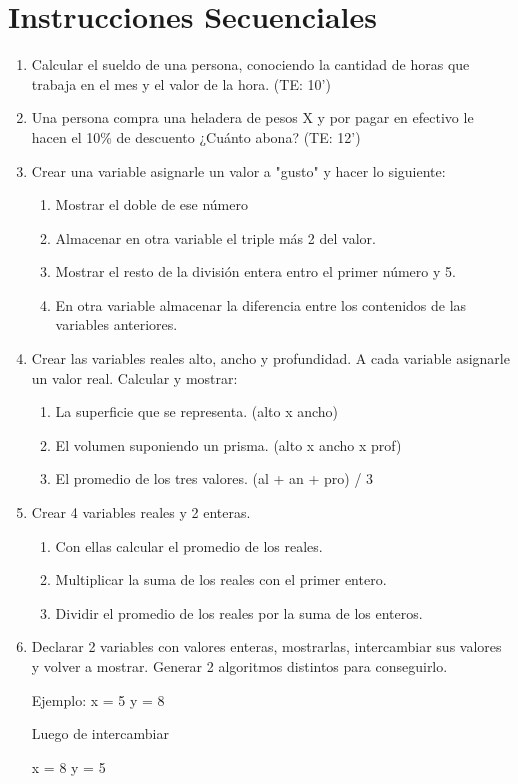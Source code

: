 \chapter{Instrucciones Secuenciales}

\begin{enumerate}[resume]

	\item Calcular el sueldo de una persona, conociendo la cantidad de horas que trabaja en el mes y el valor de la hora. (TE: 10')

	\item Una persona compra una heladera de pesos X y por pagar en efectivo le hacen el 10\% de descuento ¿Cuánto abona? (TE: 12')


  \item Crear una variable asignarle un valor a "gusto"  y hacer lo siguiente:
    \begin{enumerate}
      \item Mostrar el doble de ese n\'umero
      \item Almacenar en otra variable el triple más 2 del valor.
      \item Mostrar el resto de la división entera entro el primer número y 5.
      \item En otra variable almacenar la diferencia entre los contenidos de las variables anteriores.
    \end{enumerate}

  \item Crear las variables reales alto, ancho y profundidad. A cada variable asignarle un valor real. Calcular y mostrar:
    \begin{enumerate}
      \item La superficie que se representa. (alto x ancho)
      \item El volumen suponiendo un prisma. (alto x ancho x prof)
      \item El promedio de los tres valores. (al + an + pro) / 3
    \end{enumerate}

  \item Crear 4 variables reales y 2 enteras.
    \begin{enumerate}
      \item Con ellas calcular el promedio de los reales.
      \item Multiplicar la suma de los reales con el primer entero.
      \item Dividir el promedio de los reales por la suma de los enteros.
    \end{enumerate}

  \item Declarar 2 variables con valores enteras, mostrarlas, intercambiar sus valores
y volver a mostrar. Generar 2 algoritmos distintos para conseguirlo.

Ejemplo:         x = 5    y = 8

Luego de intercambiar

x = 8    y = 5
                         
                         



\end{enumerate}

